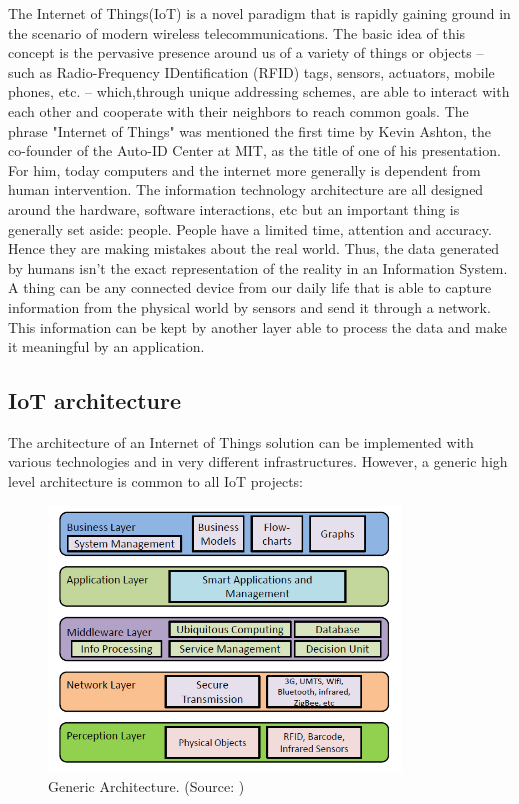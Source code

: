 \documentclass[11pt]{article}
\begin{document}
The Internet of Things(IoT) is a novel paradigm that is rapidly gaining ground in the scenario of modern wireless telecommunications. The basic idea of this concept is the pervasive presence around us of a variety of things or objects – such as Radio-Frequency IDentification (RFID) tags, sensors, actuators, mobile phones, etc. – which,through unique addressing schemes, are able to interact with each other and cooperate with their neighbors to reach common goals. \cite{2}
\newline
\newline
The phrase "Internet of Things" was mentioned the first time by Kevin Ashton, the co-founder of the Auto-ID Center at MIT, as the title of one of his presentation. For him, today computers and the internet more generally is dependent from human intervention. The information technology architecture are all designed around the hardware, software interactions, etc but an important thing is generally set aside: people. People have a limited time, attention and accuracy. Hence they are making mistakes about the real world. Thus, the data generated by humans isn't the exact representation of the reality in an Information System.
\newline
\newline
A thing can be any connected device from our daily life that is able to capture information from the physical world by sensors and send it through a network. This information can be kept by another layer able to process the data and make it meaningful by an application. 

\subsection{IoT architecture}

The architecture of an Internet of Things solution can be implemented with various technologies and in very different infrastructures. However, a generic high level architecture is common to all IoT projects:
\begin{figure}[H]
	\includegraphics[width=\textwidth,height=200pt]{assets/Abstract_IoT_Architecture.png} 
	\caption[Generic Architecture]{Generic Architecture. (Source: \cite{Future-Internet-The-Internet-of-Things})}
	\label{fig:genericArchitecture}
\end{figure}
\end{document}
